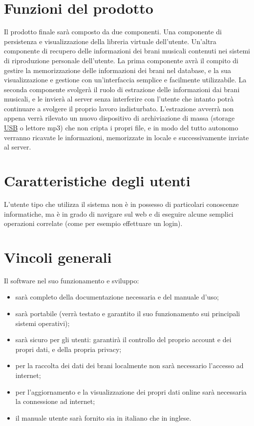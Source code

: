 \section{Funzioni del prodotto}
Il prodotto finale sar\`a composto da due componenti. Una componente di
persistenza e visualizzazione della libreria virtuale dell'utente. Un'altra
componente di recupero delle informazioni dei brani musicali contenuti nei
sistemi di riproduzione personale dell'utente. La prima componente avr\`a il
compito di gestire la memorizzazione delle informazioni dei brani nel database,
e la sua visualizzazione e gestione con un'interfaccia semplice e facilmente
utilizzabile. La seconda componente svolger\`a il ruolo di estrazione delle
informazioni dai brani musicali, e le invier\`a al server senza interferire con
l'utente che intanto potr\`a continuare a svolgere il proprio lavoro indisturbato.
L'estrazione avverr\`a non appena verr\`a rilevato un nuovo dispositivo di
archiviazione di massa (storage \underline{USB} o lettore mp3) che non cripta i
propri file, e in modo del tutto autonomo verranno ricavate le informazioni, memorizzate in
locale e successivamente inviate al server.

\section{Caratteristiche degli utenti}
L'utente tipo che utilizza il sistema non \`e in possesso di particolari
conoscenze informatiche, ma \`e in grado di navigare sul web e di eseguire alcune
semplici operazioni correlate (come per esempio effettuare un login).

\section{Vincoli generali}
Il software nel suo funzionamento e sviluppo:
\begin{itemize}
  \item sar\`a completo della documentazione necessaria e del manuale d'uso;
  \item sar\`a portabile (verr\`a testato e garantito il suo funzionamento sui
  principali sistemi operativi);
  \item sar\`a sicuro per gli utenti: garantir\`a il controllo del proprio account e
  dei propri dati, e della propria privacy;
  \item per la raccolta dei dati dei brani localmente non sar\`a necessario
  l'accesso ad internet;
  \item per l'aggiornamento e la visualizzazione dei propri dati online sar\`a
  necessaria la connessione ad internet;
  \item il manuale utente sar\`a fornito sia in italiano che in inglese.
\end{itemize}

